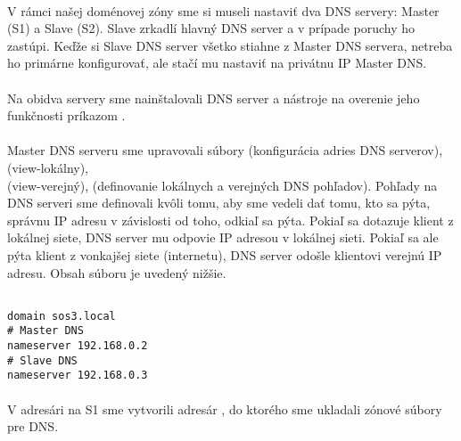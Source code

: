 \paragraph{}
V rámci našej doménovej zóny  sme si museli nastaviť dva DNS servery: Master (S1) a Slave (S2). Slave zrkadlí hlavný DNS server a v prípade poruchy ho zastúpi. Keďže si Slave DNS server všetko stiahne z Master DNS servera, netreba ho primárne konfigurovať, ale stačí mu  nastaviť  na privátnu IP Master DNS.
\paragraph{}
Na obidva servery sme nainštalovali DNS server a nástroje na overenie jeho funkčnosti príkazom .
\paragraph{}
Master DNS serveru sme upravovali súbory  (konfigurácia adries DNS serverov),  (view-lokálny),\\  (view-verejný),  (definovanie lokálnych a verejných DNS pohľadov). Pohľady na DNS serveri sme definovali kvôli tomu, aby sme vedeli dať tomu, kto sa pýta, správnu IP adresu v závislosti od toho, odkiaľ sa pýta. Pokiaľ sa dotazuje klient z lokálnej siete, DNS server mu odpovie IP adresou v lokálnej sieti. Pokiaľ sa ale pýta klient z vonkajšej siete (internetu), DNS server odošle klientovi verejnú IP adresu. Obsah súboru  je uvedený nižšie.

\noindent
{\selectfont

\begin{small}

\begin{verbatim}

domain sos3.local
# Master DNS
nameserver 192.168.0.2
# Slave DNS
nameserver 192.168.0.3

\end{verbatim}

\end{small}

}

\paragraph{}
V adresári  na S1 sme vytvorili adresár , do ktorého sme ukladali zónové súbory pre DNS.
